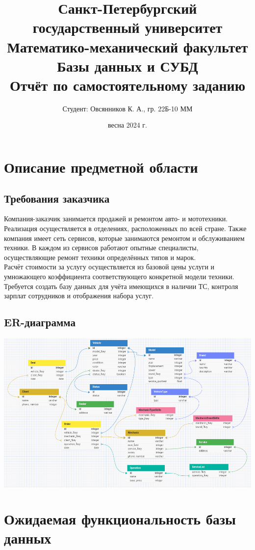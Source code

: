 \documentclass[12 pt, a4paper]{article}
\title{\textbf{Санкт-Петербургский государственный университет \\
Математико-механический факультет} \vspace{6cm} \\ Базы данных и СУБД \\
Отчёт по самостоятельному заданию\vspace{6cm}}
\author{Студент: Овсянников К. А., гр. 22Б-10 ММ }
\date{весна 2024 г.}
\begin{document}
\maketitle
\newpage
\section{Описание предметной области}
\subsection{Требования заказчика}
Компания-заказчик занимается продажей и ремонтом авто- и мототехники. Реализация осуществляется в отделениях, расположенных по всей стране. Также компания имеет сеть сервисов, которые занимаются ремонтом и обслуживанием техники. В каждом из сервисов работают опытные специалисты, осуществляющие ремонт техники определённых типов и марок.\\
Расчёт стоимости за услугу осуществляется из базовой цены услуги и умножающего коэффициента соответствующего конкретной модели техники.\\
Требуется создать базу данных для учёта имеющихся в наличии ТС, контроля зарплат сотрудников и отображения набора услуг.\\
\subsection{ER-диаграмма}
\begin{center}
\includegraphics[scale=0.62]{er.png}
\end{center}
\section{Ожидаемая функциональность базы данных}
\end{document}
